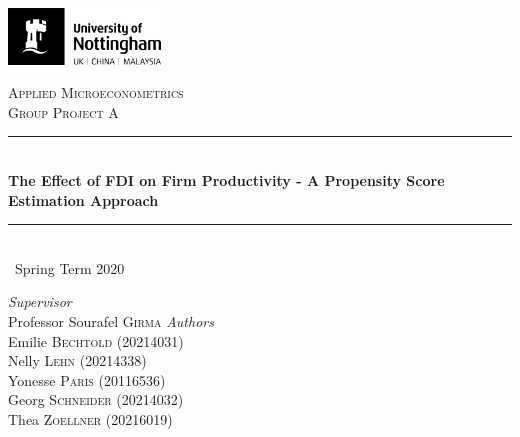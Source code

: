 \documentclass[a4paper,11pt]{scrartcl}
\newcommand{\sectionnumbering}[1]{%
  \setcounter{section}{0}%
   \renewcommand{\thesection}{\csname #1\endcsname{section}}}
\begin{document}
	\begin{titlepage}
		\newcommand{\HRule}{\rule{\linewidth}{0.5mm}}
		
	\vfill\vfill
	\includegraphics[height=1.5cm]{UoN_Logo}\\[1cm] 

	\vfill\vfill
	\center			
 
	\textsc{\Large Applied Microeconometrics}\\[0.5cm] 	
	\textsc{\large Group Project A}\\[0.5cm] 
	
	\HRule\\[0.4cm]
	{\huge\bfseries The Effect of FDI on Firm Productivity - A Propensity Score Estimation Approach}\\[0.4cm] 
	\HRule\\[0.4cm]
	
	{\large\ Spring Term 2020} 	
	\vfill\vfill\vfill\vfill	
	
\begin{flushleft}
			\large
			\textit{Supervisor}\\
			Professor Sourafel \textsc{Girma} 
			\vfill\vfill 
			\textit{Authors}\\
			Emilie \textsc{Bechtold} (20214031)\\
			Nelly  \textsc{Lehn} (20214338)\\
			Yonesse \textsc{Paris} (20116536)\\
			Georg  \textsc{Schneider} (20214032)\\
			Thea  \textsc{Zoellner} (20216019)
		\end{flushleft}
	\vfill 
	
\end{titlepage}


\sectionnumbering{Roman}
\tableofcontents

\newpage

\listoftables
\listoffigures
\newpage

\sectionnumbering{arabic}
\end{document}

